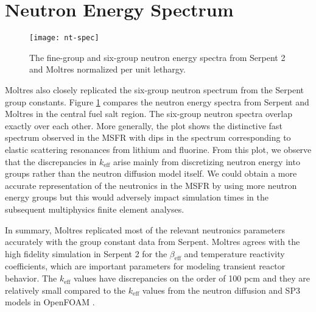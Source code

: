 \section{Neutron Energy Spectrum}

\begin{figure}[htb!]
    \centering
    \texttt{[image: nt-spec]}
    \caption{The fine-group and six-group neutron energy spectra from Serpent
    2 and Moltres normalized per unit lethargy.}
    \label{fig:ntspec}
\end{figure}

Moltres also closely replicated the six-group neutron spectrum from the
Serpent group constants. Figure \ref{fig:ntspec} compares the neutron energy
spectra from Serpent and Moltres in the central fuel salt region. The
six-group neutron spectra overlap exactly over each other. More generally, the
plot shows the distinctive fast spectrum observed in the \gls{MSFR} with dips
in the spectrum corresponding to elastic scattering resonances from lithium
and fluorine. From this plot, we observe that the discrepancies in
$k_{\text{eff}}$ arise mainly from discretizing neutron energy into groups
rather than the neutron diffusion model itself. We could obtain a more
accurate representation of the neutronics in the \gls{MSFR} by using more
neutron energy groups but this would adversely impact simulation times in the
subsequent multiphysics finite element analyses.

In summary, Moltres replicated most of the relevant neutronics parameters
accurately with the group constant data from Serpent. Moltres agrees with the
high fidelity simulation in Serpent 2 for the $\beta_{\text{eff}}$ and
temperature reactivity coefficients, which are important parameters for
modeling transient reactor behavior. The $k_{\text{eff}}$ values have
discrepancies on the order of 100 pcm and they are relatively small compared
to the $k_{\text{eff}}$ values from the neutron diffusion and SP3 models in
OpenFOAM \cite{cervi_development_2019}.
